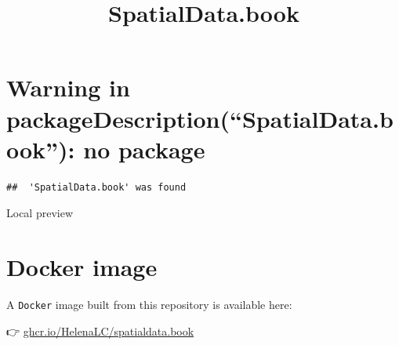 \documentclass[
  letterpaper,
  DIV=11,
  numbers=noendperiod]{scrreprt}
\title{SpatialData.book}
\author{}
\date{}
\renewcommand*\contentsname{Table of contents}
\newcommand\contentsname{Table of contents}
\begin{document}
\maketitle

\renewcommand*\contentsname{Table of contents}
{
\hypersetup{linkcolor=}
\setcounter{tocdepth}{2}
\tableofcontents
}


\chapter*{Warning in packageDescription(``SpatialData.book''): no
package}\label{warning-in-packagedescriptionspatialdata.book-no-package}


\begin{verbatim}
##  'SpatialData.book' was found
\end{verbatim}

Local preview


\chapter*{Docker image}\label{docker-image}


A \texttt{Docker} image built from this repository is available here:

👉
\href{https://ghcr.io/HelenaLC/spatialdata.book}{ghcr.io/HelenaLC/spatialdata.book}
🐳
\end{document}
